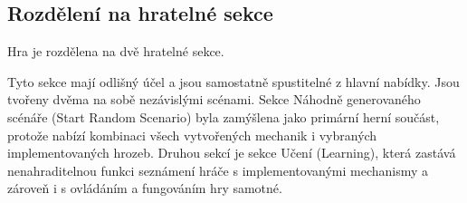 \subsection{Rozdělení na hratelné sekce}
\label{sec:rozdeleni_sekci}

Hra je rozdělena na dvě hratelné sekce.

Tyto sekce mají odlišný účel a jsou samostatně spustitelné z hlavní nabídky. Jsou tvořeny dvěma na sobě nezávislými scénami. Sekce Náhodně generovaného scénáře (Start Random Scenario) byla zamýšlena jako primární herní součást, protože nabízí kombinaci všech vytvořených mechanik i vybraných implementovaných hrozeb. Druhou sekcí je sekce Učení (Learning), která zastává nenahraditelnou funkci seznámení hráče s implementovanými mechanismy a zároveň i s ovládáním a fungováním hry samotné.